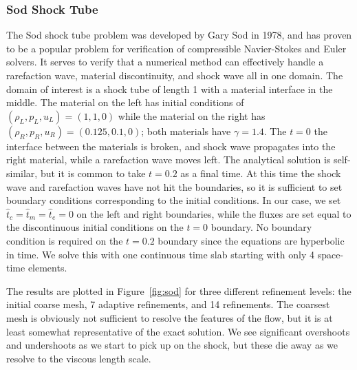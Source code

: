 \documentclass[Proposal.tex]{subfiles}
\begin{document}
\subsubsection{Sod Shock Tube}
The Sod shock tube problem was developed by Gary Sod in 1978\cite{Sod1978}, and has proven to be a popular problem for verification 
of compressible Navier-Stokes and Euler solvers.
It serves to verify that a numerical method can effectively handle a rarefaction wave, material discontinuity, and shock wave
all in one domain.
The domain of interest is a shock tube of length 1 with a material interface in the middle. The material on the left has initial conditions of 
$(\rho_L,p_L,u_L)=(1,1,0)$ while the material on the right has $(\rho_R,p_R,u_R)=(0.125,0.1,0)$; both materials have $\gamma=1.4$. 
The $t=0$ the interface between the materials is broken, 
and shock wave propagates into the right material, while a rarefaction wave moves left. The analytical solution is self-similar, but it is common to take
$t=0.2$ as a final time.
At this time the shock wave and rarefaction waves have not hit the boundaries, 
so it is sufficient to set boundary conditions corresponding to the initial conditions.
In our case, we set $\hat t_c=\hat t_m=\hat t_e=0$ on the left and right boundaries, while the fluxes are set equal to the discontinuous
initial conditions on the $t=0$ boundary. 
No boundary condition is required on the $t=0.2$ boundary since the equations are hyperbolic in time.
We solve this with one continuous time slab starting with only 4 space-time elements.

The results are plotted in Figure~\ref{fig:sod} for three different refinement levels: the initial coarse mesh, 7 adaptive refinements, and 14 refinements.
The coarsest mesh is obviously not sufficient to resolve the features of the flow, but it is at least somewhat representative of the exact solution.
We see significant overshoots and undershoots as we start to pick up on the shock, but these die away as we resolve to the viscous length scale.
\end{document}
